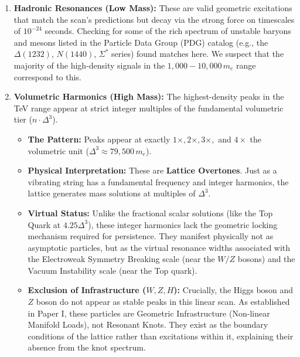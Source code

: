 \begin{enumerate}
    \item \textbf{Hadronic Resonances (Low Mass):} These are valid geometric excitations that match the scan's predictions but decay via the strong force on timescales of $10^{-24}$ seconds. Checking for some of the rich spectrum of unstable baryons and mesons listed in the Particle Data Group (PDG) catalog (e.g., the $\Delta(1232)$, $N(1440)$, $\Sigma^*$ series) found matches here. We suspect that the majority of the high-density signals in the $1,000 - 10,000 \, m_e$ range correspond to this.
    \item \textbf{Volumetric Harmonics (High Mass):} The highest-density peaks in the TeV range appear at strict integer multiples of the fundamental volumetric tier ($n \cdot \Delta^3$).
    \begin{itemize}
        \item \textbf{The Pattern:} Peaks appear at exactly $1\times, 2\times, 3\times,$ and $4\times$ the volumetric unit ($\Delta^3 \approx 79,500 \, m_e$).
        \item \textbf{Physical Interpretation:} These are \textbf{Lattice Overtones}. Just as a vibrating string has a fundamental frequency and integer harmonics, the lattice generates mass solutions at multiples of $\Delta^3$.
        \item \textbf{Virtual Status:} Unlike the fractional scalar solutions (like the Top Quark at $4.25\Delta^3$), these integer harmonics lack the geometric locking mechanism required for persistence. They manifest physically not as asymptotic particles, but as the virtual resonance widths associated with the Electroweak Symmetry Breaking scale (near the $W/Z$ bosons) and the Vacuum Instability scale (near the Top quark).
        \item \textbf{Exclusion of Infrastructure ($W,Z,H$):} Crucially, the Higgs boson and $Z$ boson do not appear as stable peaks in this linear scan. As established in Paper I, these particles are Geometric Infrastructure (Non-linear Manifold Loads), not Resonant Knots. They exist as the boundary conditions of the lattice rather than excitations within it, explaining their absence from the knot spectrum.
    \end{itemize}
\end{enumerate}